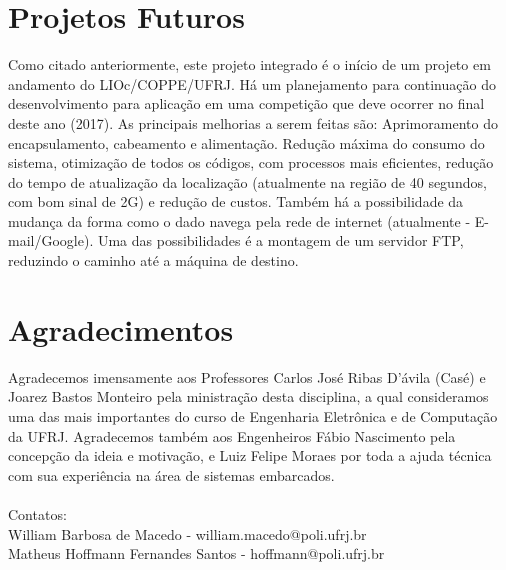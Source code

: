 \section{Projetos Futuros}
\hspace{0.5cm} Como citado anteriormente, este projeto integrado é o início de um projeto em andamento do LIOc/COPPE/UFRJ. Há um planejamento para continuação do desenvolvimento para aplicação em uma competição que deve ocorrer no final deste ano (2017). As principais melhorias a serem feitas são: Aprimoramento do encapsulamento, cabeamento e alimentação. Redução máxima do consumo do sistema, otimização de todos os códigos, com processos mais eficientes, redução do tempo de atualização da localização (atualmente na região de 40 segundos, com bom sinal de 2G) e redução de custos. Também há a possibilidade da mudança da forma como o dado navega pela rede de internet (atualmente - E-mail/Google). Uma das possibilidades é a montagem de um servidor FTP, reduzindo o caminho até a máquina de destino.

\section{Agradecimentos}
\hspace{0.5cm} Agradecemos imensamente aos Professores Carlos José Ribas D'ávila (Casé) e Joarez Bastos Monteiro pela ministração desta disciplina, a qual consideramos uma das mais importantes do curso de Engenharia Eletrônica e de Computação da UFRJ. Agradecemos também aos Engenheiros Fábio Nascimento pela concepção da ideia e motivação, e Luiz Felipe Moraes por toda a ajuda técnica com sua experiência na área de sistemas embarcados.\\\\Contatos:\\William Barbosa de Macedo -   william.macedo@poli.ufrj.br\\Matheus Hoffmann Fernandes Santos - hoffmann@poli.ufrj.br


